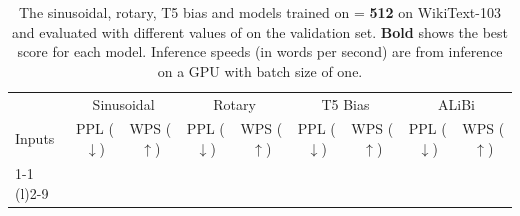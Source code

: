 \begin{table}[]
\small
\caption{The sinusoidal, rotary, T5 bias and \al models trained on \lt = \textbf{512} on WikiText-103 and evaluated with different values of \li on the validation set. \textbf{Bold} shows the best score for each model. Inference speeds (in words per second) are from inference on a GPU with batch size of one.}
\label{tab:appendix:wt103_extra_512}
\begin{center}

\begin{tabular}{@{}lcccccccc@{}} \toprule
 &  \multicolumn{2}{c}{Sinusoidal} & \multicolumn{2}{c}{Rotary} &\multicolumn{2}{c}{T5 Bias} & \multicolumn{2}{c}{ALiBi} \\
Inputs & PPL ($\downarrow$) & WPS ($\uparrow$)& PPL ($\downarrow$) & WPS ($\uparrow$)& PPL ($\downarrow$) & WPS ($\uparrow$)& PPL ($\downarrow$) & WPS ($\uparrow$) \\ \cmidrule(r){1-1} \cmidrule(l){2-9}


\end{tabular}
\end{center}
\end{table}
